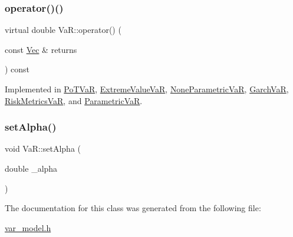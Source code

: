 \hypertarget{classVaR_a1bd868d9953bfaeb49f5bf7d16986631}{}\label{classVaR_a1bd868d9953bfaeb49f5bf7d16986631} 
\subsubsection{\texorpdfstring{operator()()}{operator()()}\hspace{0.1cm}{\footnotesize\ttfamily [3/3]}}
{\footnotesize\ttfamily virtual double Va\+R\+::operator() (\begin{DoxyParamCaption}\item[{const \hyperlink{compute__returns__eigen_8h_a1eb6a9306ef406d7975f3cbf2e247777}{Vec} \&}]{returns }\end{DoxyParamCaption}) const\hspace{0.3cm}{\ttfamily [pure virtual]}}



Implemented in \hyperlink{classPoTVaR_a3360bbbeceae9bbd0c721e48586bf38c}{Po\+T\+VaR}, \hyperlink{classExtremeValueVaR_a3be021ee0faa2285bcb6be19815e3dc7}{Extreme\+Value\+VaR}, \hyperlink{classNoneParametricVaR_a181d6152dcbdc7ce323e5d4b672a14f8}{None\+Parametric\+VaR}, \hyperlink{classGarchVaR_ac6d01b6567a6d0629cd95be716677763}{Garch\+VaR}, \hyperlink{classRiskMetricsVaR_a3e79a82675a93c7467451146131a2ec5}{Risk\+Metrics\+VaR}, and \hyperlink{classParametricVaR_aa07f1d64aff5abf484835cd9105af9c9}{Parametric\+VaR}.

\hypertarget{classVaR_a5834560649dcbe686a47eaba4f0359b9}{}\label{classVaR_a5834560649dcbe686a47eaba4f0359b9} 
\subsubsection{\texorpdfstring{set\+Alpha()}{setAlpha()}}
{\footnotesize\ttfamily void Va\+R\+::set\+Alpha (\begin{DoxyParamCaption}\item[{double}]{\+\_\+alpha }\end{DoxyParamCaption})}



The documentation for this class was generated from the following file\+:\begin{DoxyCompactItemize}
\item 
\hyperlink{var__model_8h}{var\+\_\+model.\+h}\end{DoxyCompactItemize}
